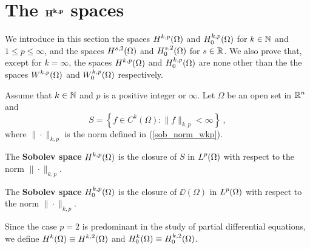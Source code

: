 \section{The $\displaystyle \mathbf{H^{k,p}}$ spaces} \label{WequalH}

We introduce in this section the spaces $\displaystyle H^{k,p}(\Omega)$ and
$\displaystyle H^{k,p}_0(\Omega)$ for $k \in \mathbb{N}$ and
$1 \leq p \leq \infty$, and the spaces
$\displaystyle H^{s,2}(\Omega)$ and $\displaystyle H^{s,2}_0(\Omega)$
for $s\in \mathbb{R}$.  We also prove that, except for $k=\infty$, the spaces
$\displaystyle H^{k,p}(\Omega)$ and $\displaystyle H^{k,p}_0(\Omega)$ are
none other than the the spaces
$\displaystyle W^{k,p}(\Omega)$ and $\displaystyle W^{k,p}_0(\Omega)$
respectively.

\begin{defn} \label{sob_H_spaces}
Assume that $k\in \mathbb{N}$ and $p$ is a positive integer or $\infty$.
Let $\Omega$ be an open set in $\displaystyle \mathbb{R}^n$ and
\[
S = \left\{ f \in C^k(\Omega) :  \|f\|_{k,p} < \infty \right\} \ ,
\]
where $\|\cdot\|_{k,p}$ is the norm defined in (\ref{sob_norm_wkp}).

The {\bfseries Sobolev space}
$\displaystyle H^{k,p}(\Omega)$ is the closure of $S$ in
$\displaystyle L^p(\Omega)$ with respect to the norm $\|\cdot\|_{k,p}$.

The {\bfseries Sobolev space}
$\displaystyle H^{k,p}_0(\Omega)$ is the closure of $\DD(\Omega)$ in
$\displaystyle L^p(\Omega)$ with respect to the norm $\|\cdot\|_{k,p}$.

Since the case $p=2$ is predominant in the study of partial
differential equations, we define
$\displaystyle H^k(\Omega) \equiv H^{k,2}(\Omega)$ and
$\displaystyle H^k_0(\Omega) \equiv H^{k,2}_0(\Omega)$.
\end{defn}


